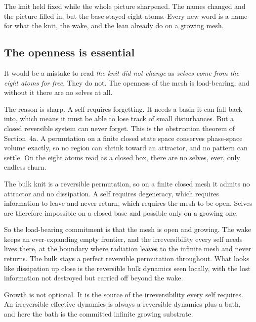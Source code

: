 \begin{principle}
The knit held fixed while the whole picture sharpened. The names changed and the picture filled in, but the base stayed eight atoms. Every new word is a name for what the knit, the wake, and the lean already do on a growing mesh.
\end{principle}

\subsection{The openness is essential}

It would be a mistake to read \emph{the knit did not change} as \emph{selves come from the eight atoms for free}. They do not. The openness of the mesh is load-bearing, and without it there are no selves at all.

The reason is sharp. A self requires forgetting. It needs a basin it can fall back into, which means it must be able to lose track of small disturbances. But a closed reversible system can never forget. This is the obstruction theorem of Section~4a. A permutation on a finite closed state space conserves phase-space volume exactly, so no region can shrink toward an attractor, and no pattern can settle. On the eight atoms read as a closed box, there are no selves, ever, only endless churn.

\begin{theorem}
The bulk knit is a reversible permutation, so on a finite closed mesh it admits no attractor and no dissipation. A self requires degeneracy, which requires information to leave and never return, which requires the mesh to be open. Selves are therefore impossible on a closed base and possible only on a growing one.
\end{theorem}

So the load-bearing commitment is that the mesh is open and growing. The wake keeps an ever-expanding empty frontier, and the irreversibility every self needs lives there, at the boundary where radiation leaves to the infinite mesh and never returns. The bulk stays a perfect reversible permutation throughout. What looks like dissipation up close is the reversible bulk dynamics seen locally, with the lost information not destroyed but carried off beyond the wake.

\begin{result}
Growth is not optional. It is the source of the irreversibility every self requires. An irreversible effective dynamics is always a reversible dynamics plus a bath, and here the bath is the committed infinite growing substrate.
\end{result}

